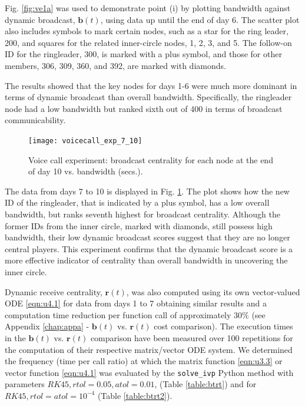 Fig. \ref{fig:ve1a} was used to demonstrate point (i) by plotting bandwidth against dynamic broadcast, $\mathbf{b}(t)$, using data up until the end of day 6. The scatter plot also includes symbols to mark certain nodes, such as a star for the ring leader, 200, and squares for the related inner-circle nodes, 1, 2, 3, and 5. The follow-on ID for the ringleader, 300, is marked with a plus symbol, and those for other members, 306, 309, 360, and 392, are marked with diamonds.

The results showed that the key nodes for days 1-6 were much more dominant in terms of dynamic broadcast than overall bandwidth. Specifically, the ringleader node had a low bandwidth but ranked sixth out of 400 in terms of broadcast communicability.

\begin{figure}[h]\centering
    \texttt{[image: voicecall\_exp\_7\_10]}
    \caption{Voice call experiment: broadcast centrality for each node at the end of day 10 vs. bandwidth (secs.).}
    \label{fig:ve1b}
    \bigskip
\end{figure}

The data from days 7 to 10 is displayed in Fig. \ref{fig:ve1b}. The plot shows how the new ID of the ringleader, that is indicated by a plus symbol, has a low overall bandwidth, but ranks seventh highest for broadcast centrality. Although the former IDs from the inner circle, marked with diamonds, still possess high bandwidth, their low dynamic broadcast scores suggest that they are no longer central players. This experiment confirms that the dynamic broadcast score is a more effective indicator of centrality than overall bandwidth in uncovering the inner circle.

Dynamic receive centrality, $\mathbf{r}(t)$, was also computed using its own vector-valued ODE \eqref{eqn:u4.1} for data from days 1 to 7 obtaining similar results and a computation time reduction per function call of approximately $30\%$ (see Appendix \ref{chap:appa} - $\mathbf{b}(t)$ vs. $\mathbf{r}(t)$ cost comparison). The execution times in the $\mathbf{b}(t)$ vs. $\mathbf{r}(t)$ comparison have been measured over 100 repetitions for the computation of their respective matrix/vector ODE system. We determined the frequency (time per call ratio) at which the matrix function \eqref{eqn:u3.3} or vector function \eqref{eqn:u4.1} was evaluated by the \texttt{solve\_ivp} Python method with parameters $RK45, rtol=0.05, atol=0.01$, (Table \ref{table:btrt}) and for $RK45, rtol=atol=10^{-4}$ (Table \ref{table:btrt2}).

